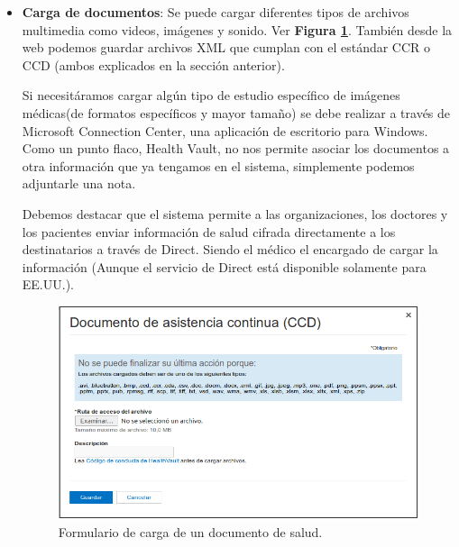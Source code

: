 \begin{itemize}
\item \textbf{Carga de documentos}: Se puede cargar diferentes tipos de archivos multimedia como videos, imágenes y sonido. Ver \textbf{Figura \ref{carga_documento}}. 
También desde la web podemos guardar archivos XML que cumplan con el estándar CCR o CCD (ambos explicados en la sección anterior).

Si necesitáramos cargar algún tipo de estudio específico de imágenes médicas(de formatos específicos y mayor tamaño) se debe realizar a través de Microsoft Connection Center, una aplicación de escritorio para Windows. Como un punto flaco, Health Vault, no nos permite asociar los documentos a otra información que ya tengamos en el sistema, simplemente podemos adjuntarle una nota.

	Debemos destacar que el sistema permite a las organizaciones, los doctores y los pacientes enviar información de salud cifrada directamente a los destinatarios a través de Direct. 
    Siendo el médico el encargado de cargar la información (Aunque el servicio de Direct está disponible solamente para EE.UU.).%

    \begin{figure}[h]
      \centering
      \includegraphics[width=.8\textwidth]{img/tp1/3-carga_documento}
      \caption{Formulario de carga de un documento de salud.}
      \label{carga_documento}
    \end{figure} 


\end{itemize}
